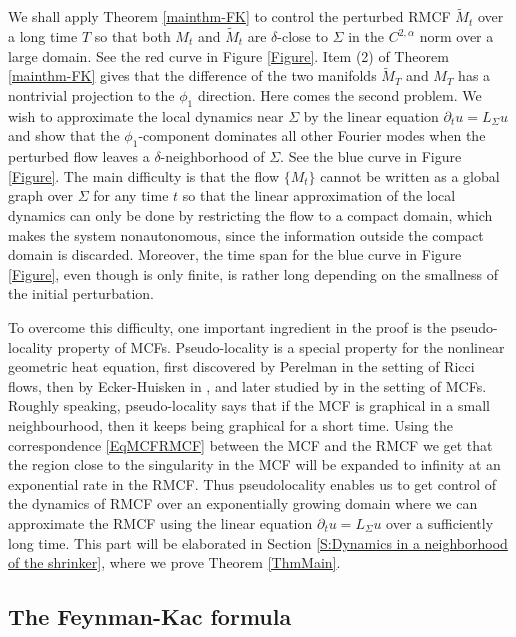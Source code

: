 \documentclass[12pt]{amsart}
\numberwithin{equation}{section}
\numberwithin{equation}{section}
\newcommand{\dt}{\delta}
\newcommand{\al}{\alpha}
\begin{document}
	We shall apply Theorem \ref{mainthm-FK} to control the perturbed RMCF $\widetilde M_t$ over a long time $T$ so that both $M_t$ and $\widetilde M_t$ are $\dt$-close to $\Sigma$ in the $C^{2,\al}$ norm over a large domain. See the red curve in Figure \ref{Figure}. Item (2) of Theorem \ref{mainthm-FK} gives that the difference of the two manifolds $\widetilde M_T$ and $M_T$ has a nontrivial projection to the $\phi_1$ direction. Here comes the second problem. We wish to approximate the local dynamics near $\Sigma$ by the linear equation $\partial_t u=L_\Sigma u$ and show that the $\phi_1$-component dominates all other Fourier modes when the perturbed flow leaves a $\dt$-neighborhood of $\Sigma$. See the blue curve in Figure \ref{Figure}. The main difficulty is that the flow $\{M_t\}$ cannot be written as a global graph over $\Sigma$ for any time $t$ so that the linear approximation of the local dynamics can only be done by restricting the flow to a compact domain, which makes the system nonautonomous, since the information outside the compact domain is discarded. Moreover, the time span for the blue curve in Figure \ref{Figure}, even though is only finite, is rather long depending on the smallness of the initial perturbation.  
	
	To overcome this difficulty, one important ingredient in the proof is the pseudo-locality property of MCFs. Pseudo-locality is a special property for the nonlinear geometric heat equation, first discovered by Perelman in the setting of Ricci flows, then by Ecker-Huisken in \cite{EH}, and later studied by \cite{INS} in the setting of MCFs. Roughly speaking, pseudo-locality says that if the MCF is graphical in a small neighbourhood, then it keeps being graphical for a short time. Using the correspondence \eqref{EqMCFRMCF} between the MCF and the 
	RMCF we get that the region close to the singularity in the MCF will be expanded to infinity at an exponential rate in the RMCF. Thus pseudolocality enables us to get control of the dynamics of RMCF over an exponentially growing domain where we can approximate the RMCF using the linear equation $\partial_t u=L_\Sigma u$ over a sufficiently long time.  This part will be elaborated in Section \ref{S:Dynamics in a neighborhood of the shrinker}, where we prove Theorem \ref{ThmMain}. 
	
	
	\subsection{The Feynman-Kac formula}
	
\end{document}
